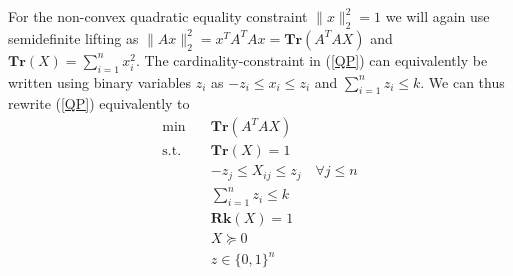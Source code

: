 \documentclass{elsarticle}
\begin{document}
For the non-convex quadratic equality constraint $\|x\|_2^2 = 1$ we will again use semidefinite lifting as $\|Ax\|_2^2 = x^TA^TAx = \textbf{Tr}(A^TAX)$ and $\textbf{Tr}(X) = \sum_{i=1}^n x_i^2$. 
The cardinality-constraint in (\ref{QP}) can equivalently be written using binary variables $z_i$ as $-z_i \leq x_i \leq z_i$ and $\sum_{i=1}^n z_i \leq k$. We can thus rewrite (\ref{QP}) equivalently to
% 
% 
\begin{align}\label{Rk1MISDP}
 \text{min} \quad & \textbf{Tr}(A^TAX) \nonumber \\
 \text{s.t.} \quad & \textbf{Tr}(X) = 1 \nonumber \\
 & -z_j \leq X_{ij} \leq z_j \quad \forall j \leq n \nonumber \\
 & \sum_{i=1}^n z_i \leq k \tag{Rk1MISDP} \\
 & \textbf{Rk}(X) = 1 \nonumber \\
 & X \succeq 0  \nonumber \\
 & z \in \{0,1\}^n \nonumber
\end{align}
\end{document}
